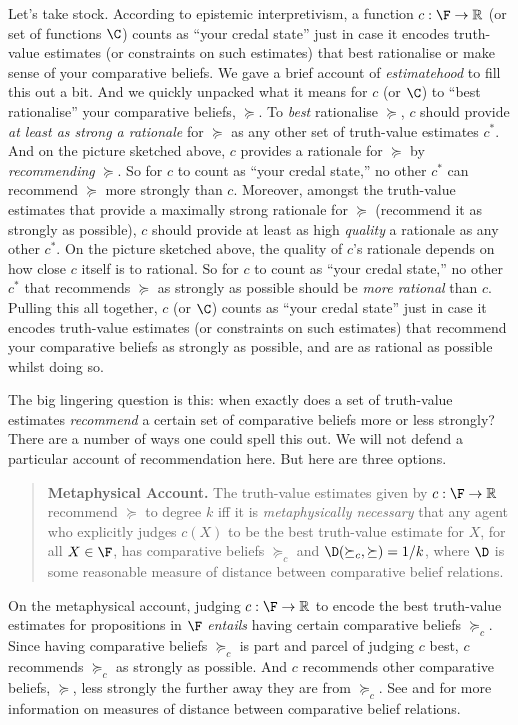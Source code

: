 Let's take stock. According to epistemic interpretivism, a function $c:\F\rightarrow\mathbb{R}$ (or set of functions $\C$) counts as ``your credal state'' just in case it encodes truth-value estimates (or constraints on such estimates) that best rationalise or make sense of your comparative beliefs. We gave a brief account of \textit{estimatehood} to fill this out a bit. And we quickly unpacked what it means for $c$ (or $\C$) to ``best rationalise'' your comparative beliefs, $\succeq$. To \textit{best} rationalise $\succeq$, $c$ should provide \textit{at least as strong a rationale} for $\succeq$ as any other set of truth-value estimates $c^*$. And on the picture sketched above, $c$ provides a rationale for $\succeq$ by \textit{recommending} $\succeq$. So for $c$ to count as ``your credal state,'' no other $c^*$ can recommend $\succeq$ more strongly than $c$. Moreover, amongst the truth-value estimates that provide a maximally strong rationale for $\succeq$ (recommend it as strongly as possible), $c$ should provide at least as high \textit{quality} a rationale as any other $c^*$. On the picture sketched above, the quality of $c$'s rationale depends on how close $c$ itself is to rational. So for $c$ to count as ``your credal state,'' no other $c^*$ that recommends $\succeq$ as strongly as possible should be \textit{more rational} than $c$. Pulling this all together, $c$ (or $\C$) counts as ``your credal state'' just in case it encodes truth-value estimates (or constraints on such estimates) that recommend your comparative beliefs as strongly as possible, and are as rational as possible whilst doing so.

The big lingering question is this: when exactly does a set of truth-value estimates \textit{recommend} a certain set of comparative beliefs more or less strongly? There are a number of ways one could spell this out. We will not defend a particular account of recommendation here. But here are three options.
\begin{quote}
\textbf{Metaphysical Account.} The truth-value estimates given by $c:\F\rightarrow\mathbb{R}$ recommend $\succeq$ to degree $k$ iff it is \textit{metaphysically necessary} that any agent who explicitly judges $c(X)$ to be the best truth-value estimate for $X$, for all $X\in\F$, has comparative beliefs $\succeq_c$ and $\D(\succeq_c,\succeq)=1/k$, where $\D$ is some reasonable measure of distance between comparative belief relations. 
\end{quote}
On the metaphysical account, judging $c:\F\rightarrow\mathbb{R}$ to encode the best truth-value estimates for propositions in $\F$ \textit{entails} having certain comparative beliefs $\succeq_c$. Since having comparative beliefs $\succeq_c$ is part and parcel of judging $c$ best, $c$ recommends $\succeq_c$ as strongly as possible. And $c$ recommends other comparative beliefs, $\succeq$, less strongly the further away they are from $\succeq_c$. See \citet{Deza2009} and \citet{Fitelson2015} for more information on measures of distance between comparative belief relations.

